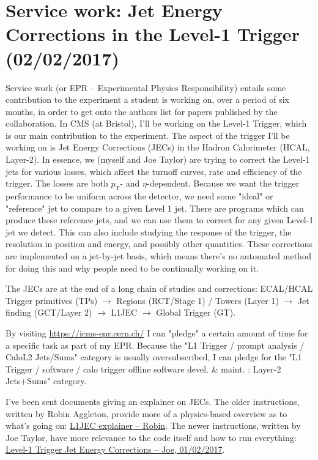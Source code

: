 \newpage
\section{Service work: Jet Energy Corrections in the Level-1 Trigger (02/02/2017)}

Service work (or EPR -- Experimental Physics Responsibility) entails some contribution to the experiment a student is working on, over a period of six months, in order to get onto the authors list for papers published by the collaboration. In CMS (at Bristol), I'll be working on the Level-1 Trigger, which is our main contribution to the experiment. The aspect of the trigger I'll be working on is Jet Energy Corrections (JECs) in the Hadron Calorimeter (HCAL, Layer-2). In essence, we (myself and Joe Taylor) are trying to correct the Level-1 jets for various losses, which affect the turnoff curves, rate and efficiency of the trigger. The losses are both $p_{\mathrm{T}}$- and $\eta$-dependent. Because we want the trigger performance to be uniform across the detector, we need some "ideal" or "reference" jet to compare to a given Level 1 jet. There are programs which can produce these reference jets, and we can use them to correct for any given Level-1 jet we detect. This can also include studying the response of the trigger, the resolution in position and energy, and possibly other quantities. These corrections are implemented on a jet-by-jet basis, which means there's no automated method for doing this and why people need to be continually working on it.

The JECs are at the end of a long chain of studies and corrections: ECAL/HCAL Trigger primitives (TPs) $\rightarrow$ Regions (RCT/Stage 1) / Towers (Layer 1) $\rightarrow$ Jet finding (GCT/Layer 2) $\rightarrow$ L1JEC $\rightarrow$ Global Trigger (GT).

By visiting \url{https://icms-epr.cern.ch/} I can "pledge" a certain amount of time for a specific task as part of my EPR. Because the "L1 Trigger / prompt analysis / CaloL2 Jets/Sums" category is usually oversubscribed, I can pledge for the "L1 Trigger / software / calo trigger offline software devel. \& maint. : Layer-2 Jets+Sums" category. 

I've been sent documents giving an explainer on JECs. The older instructions, written by Robin Aggleton, provide more of a physics-based overview as to what's going on: \href{run:./sec20/l1jec_explainer.pdf}{L1JEC explainer -- Robin}. The newer instructions, written by Joe Taylor, have more relevance to the code itself and how to run everything: \href{run:./sec20/2017_02_01_L1JECinstructions.pdf}{Level-1 Trigger Jet Energy Corrections -- Joe, 01/02/2017}.


